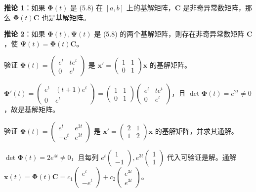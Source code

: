 \textbf{推论 1}：如果 $\boldsymbol{\Phi}(t)$ 是 (5.8) 在 $[a,b]$ 上的基解矩阵，$\mathbf{C}$ 是非奇异常数矩阵，那么 $\boldsymbol{\Phi}(t)\mathbf{C}$ 也是基解矩阵。

\textbf{推论 2}：如果 $\boldsymbol{\Phi}(t), \boldsymbol{\Psi}(t)$ 是 (5.8) 的两个基解矩阵，则存在非奇异常数矩阵 $\mathbf{C}$，使 $\boldsymbol{\Psi}(t) = \boldsymbol{\Phi}(t)\mathbf{C}$。

\begin{example}
验证 $\boldsymbol{\Phi}(t) = \begin{pmatrix} e^t & te^t \\ 0 & e^t \end{pmatrix}$ 是 $\mathbf{x}' = \begin{pmatrix} 1 & 1 \\ 0 & 1 \end{pmatrix}\mathbf{x}$ 的基解矩阵。
\end{example}

\begin{solution}
$\boldsymbol{\Phi}'(t) = \begin{pmatrix} e^t & (t+1)e^t \\ 0 & e^t \end{pmatrix} = \begin{pmatrix} 1 & 1 \\ 0 & 1 \end{pmatrix}\begin{pmatrix} e^t & te^t \\ 0 & e^t \end{pmatrix}$，且 $\det\boldsymbol{\Phi}(t) = e^{2t} \neq 0$，故是基解矩阵。
\end{solution}

\begin{example}
验证 $\boldsymbol{\Phi}(t) = \begin{pmatrix} e^t & e^{3t} \\ -e^t & e^{3t} \end{pmatrix}$ 是 $\mathbf{x}' = \begin{pmatrix} 2 & 1 \\ 1 & 2 \end{pmatrix}\mathbf{x}$ 的基解矩阵，并求其通解。
\end{example}

\begin{solution}
$\det\boldsymbol{\Phi}(t) = 2e^{4t} \neq 0$，且每列 $e^t\begin{pmatrix}1\\-1\end{pmatrix}, e^{3t}\begin{pmatrix}1\\1\end{pmatrix}$ 代入可验证是解。通解 $\mathbf{x}(t) = \boldsymbol{\Phi}(t)\mathbf{C} = c_1\begin{pmatrix}e^t\\-e^t\end{pmatrix} + c_2\begin{pmatrix}e^{3t}\\e^{3t}\end{pmatrix}$。
\end{solution}

